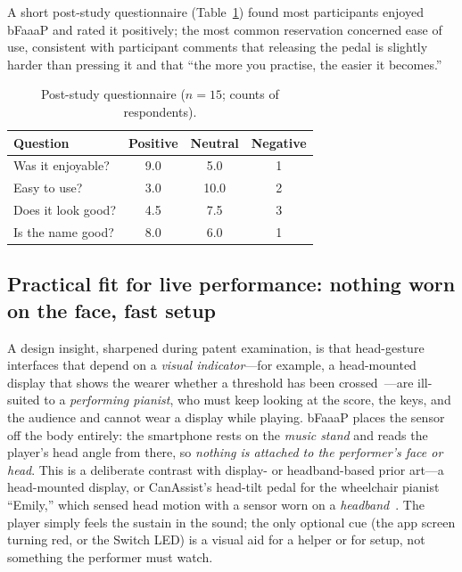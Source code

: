 A short post-study questionnaire (Table~\ref{tab:survey}) found most participants
enjoyed bFaaaP and rated it positively; the most common reservation concerned
ease of use, consistent with participant comments that releasing the pedal is
slightly harder than pressing it and that ``the more you practise, the easier it
becomes.''

\begin{table}[tbp]
\caption{Post-study questionnaire ($n=15$; counts of respondents).}
\label{tab:survey}
\small
\begin{tabular}{@{}lccc@{}}
\toprule
Question & Positive & Neutral & Negative \\
\midrule
Was it enjoyable?     & 9.0 & 5.0 & 1 \\
Easy to use?          & 3.0 & 10.0 & 2 \\
Does it look good?    & 4.5 & 7.5 & 3 \\
Is the name good?     & 8.0 & 6.0 & 1 \\
\bottomrule
\end{tabular}
\end{table}

\subsection{Practical fit for live performance: nothing worn on the face, fast setup}
\label{sec:eyesfree}
A design insight, sharpened during patent examination, is that head-gesture
interfaces that depend on a \emph{visual indicator}---for example, a head-mounted
display that shows the wearer whether a threshold has been crossed~\cite{hmd_jp2017}---are
ill-suited to a \emph{performing pianist}, who must keep looking at the score, the
keys, and the audience and cannot wear a display while playing. bFaaaP places the
sensor off the body entirely: the smartphone rests on the \emph{music stand} and
reads the player's head angle from there, so \emph{nothing is attached to the
performer's face or head}. This is a deliberate contrast with display- or
headband-based prior art---a head-mounted display, or CanAssist's head-tilt pedal
for the wheelchair pianist ``Emily,'' which sensed head motion with a sensor worn on
a \emph{headband}~\cite{canassist}. The player simply feels the sustain in the sound;
the only optional cue (the app screen turning red, or the Switch LED) is a visual aid
for a helper or for setup, not something the performer must watch.

